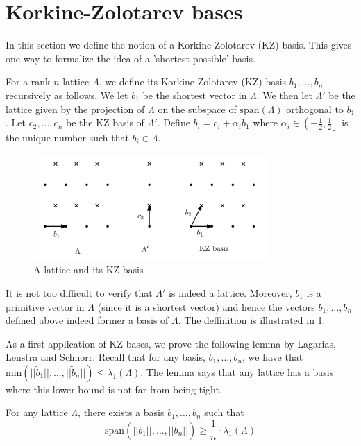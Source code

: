 \section{Korkine-Zolotarev bases}
In this section we define the notion of a Korkine-Zolotarev (KZ) basis. This
gives one way to formalize the idea of a 'shortest possible' basis.
\begin{definition}
  For a rank $n$ lattice $\Lambda$, we define its Korkine-Zolotarev (KZ) basis
  $b_1,\dots,b_n$ recursively as follows. We let $b_1$ be the shortest vector
  in $\Lambda$. We then let $\Lambda'$ be the lattice given by the projection
  of $\Lambda$ on the subspace of $\mathrm{span}(\Lambda)$ orthogonal to $b_1$.
  Let $c_2,\dots,c_n$ be the KZ basis of $\Lambda'$. Define
  $b_i=c_i+\alpha_ib_1$ where
$\alpha_i\in\left(-\frac{1}{2},\frac{1}{2}\right]$ is the unique number such
that $b_i\in\Lambda$.
\end{definition}
\begin{figure}[h!]
  \centering
\includegraphics[width=0.8\textwidth]{Images/kzbasis.png}
  \caption{A lattice and its KZ basis}
  \label{fig:kzbasis}
\end{figure}
It is not too difficult to verify that $\Lambda'$ is indeed a lattice.
Moreover, $b_1$ is a primitive vector in $\Lambda$ (since it is a shortest
vector) and hence the vectors $b_1,\dots,b_n$ defined above indeed former
a basis of $\Lambda$. The deffinition is illustrated in \ref{fig:kzbasis}.
\par As a first application of KZ bases, we prove the following lemma by
Lagarias, Lenstra and Schnorr. Recall that for any basis, $b_1,\dots,b_n$, we 
have that
$\mathrm{min}(||\tilde{b}_1||,\dots,||\tilde{b}_n||)\leq\lambda_1(\Lambda).$
The lemma says that any lattice has a basis where this lower bound is not far 
from being tight.
\begin{lemma}
  For any lattice $\Lambda$, there exists a basis $b_1,\dots,b_n$ such that
  \begin{equation}
    \mathrm{span}(||\tilde{b}_1||,\dots,||\tilde{b}_n||)\geq
    \frac{1}{n}\cdot\lambda_1(\Lambda)
  \end{equation}
\end{lemma}
